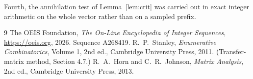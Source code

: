\documentclass[11pt,a4paper]{article}
\theoremstyle{plain}
\theoremstyle{definition}
\begin{document}
Fourth, the annihilation test of Lemma~\ref{lem:crit} was carried out in exact integer
arithmetic on the whole vector rather than on a sampled prefix.

\begin{thebibliography}{9}
 The OEIS Foundation, \emph{The On-Line Encyclopedia of Integer
Sequences}, \url{https://oeis.org}, 2026. Sequence A268419.
 R.~P.~Stanley, \emph{Enumerative Combinatorics}, Volume 1, 2nd ed.,
Cambridge University Press, 2011. (Transfer-matrix method, Section 4.7.)
 R.~A.~Horn and C.~R.~Johnson, \emph{Matrix Analysis}, 2nd ed., Cambridge
University Press, 2013.
\end{thebibliography}
\end{document}
